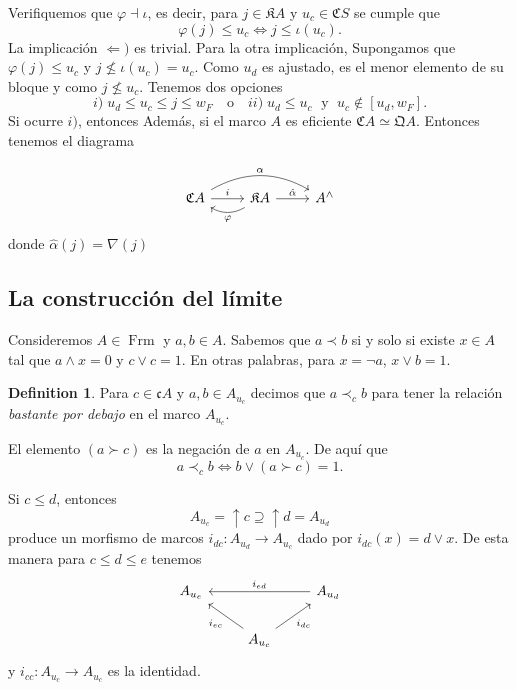 \documentclass[11pt]{amsart}
\DeclareMathOperator{\Frm}{Frm}
\theoremstyle{plain}
\theoremstyle{definition}
\newtheorem{dfn}[thm]{Definition}
\begin{document}
Verifiquemos que $\varphi\dashv \iota$, es decir, para $j\in \mathfrak{K}A$ y $u_c\in \mathfrak{C}S$ se cumple que 
\[
\varphi(j)\leq u_c\Leftrightarrow j\leq \iota(u_c).
\]
La implicación $\Leftarrow)$ es trivial. Para la otra implicación, Supongamos que $\varphi(j)\leq u_c$ y $j\nleq \iota(u_c)=u_c$. Como $u_d$ es ajustado, es el menor elemento de su bloque y como $j\nleq u_c$. Tenemos dos opciones
\[
i)\;  u_d\leq u_c\leq j\leq w_F \quad \mbox{o}\quad ii)\;u_d\leq u_c\; \mbox{ y }\;u_c\notin [u_d, w_F].
\]
Si ocurre $i)$, entonces 
Además, si el marco $A$ es eficiente $\mathfrak{C}A\simeq \mathfrak{Q}A$. Entonces tenemos el diagrama 

\[
\begin{tikzcd}
\mathfrak{C}A \arrow[r, "i"] \arrow[rr, "\alpha", bend left] & \mathfrak{K}A \arrow[r, "\hat{\alpha}"] \arrow[l, "\varphi", bend left] & A^\wedge
\end{tikzcd}
\]
donde $\hat{\alpha}(j)=\nabla(j)$


\subsection{La construcción del límite} 

Consideremos $A\in \Frm$ y $a, b\in A$. Sabemos que $a\prec b$ si y solo si existe $x\in A$ tal que $a\wedge x=0$ y $c\vee c=1$. En otras palabras, para $x=\neg a$, $x\vee b=1$.

\begin{dfn}\label{Bb en CA}
    Para $c\in \mathfrak{c}A$ y $a,b\in A_{u_c}$ decimos que $a\prec_c b$ para tener la relación \emph{bastante por debajo} en el marco $A_{u_c}$.
\end{dfn}

El elemento $(a\succ c)$ es la negación de $a$ en $A_{u_c}$. De aquí que
\[
a\prec_cb\Leftrightarrow b\vee (a\succ c)=1.
\]

Si $c\leq d$, entonces 
\[
A_{u_c}=\uparrow c\supseteq \uparrow d=A_{u_d}
\]
produce un morfismo de marcos $i_{dc}\colon A_{u_d}\to A_{u_c}$ dado por $i_{dc}(x)=d\vee x$. De esta manera para $c\leq d\leq e$ tenemos
\[\begin{tikzcd}
	{A_{u_e}} && {A_{u_d}} \\
	& {A_{u_c}}
	\arrow["{i_{ed}}"', from=1-3, to=1-1]
	\arrow["{i_{ec}}", from=2-2, to=1-1]
	\arrow["{i_{dc}}"', from=2-2, to=1-3]
\end{tikzcd}\]
y $i_{cc}\colon A_{u_c}\to A_{u_c}$ es la identidad.\\
\end{document}
